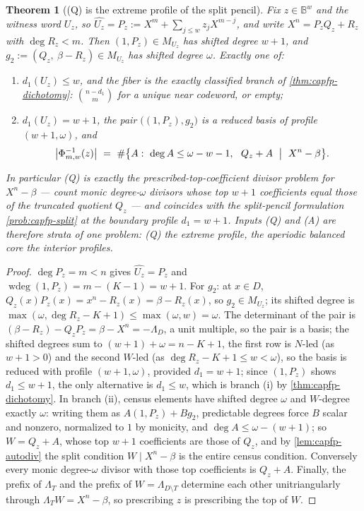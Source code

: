 \documentclass[11pt]{article}
\newtheorem{theorem}{Theorem}[section]
\theoremstyle{definition}
\theoremstyle{remark}
\newcommand{\B}{\mathbb{B}}
\begin{document}
\begin{theorem}[\textup{(Q)} is the extreme profile of the split pencil]\label{thm:capfp-Q-unify}
Fix $z\in\B^w$ and the witness word $U_z$, so $\widehat{U_z}=P_z:=X^m+\sum_{j\le w}z_jX^{m-j}$, and write $X^n=P_zQ_z+R_z$ with $\deg R_z<m$.  Then $(1,P_z)\in M_{U_z}$ has shifted degree $w+1$, and $g_2:=(Q_z,\ \beta-R_z)\in M_{U_z}$ has shifted degree $\omega$.  Exactly one of:
\begin{enumerate}[label=\textup{(\roman*)}]
\item $d_1(U_z)\le w$, and the fiber is the exactly classified branch of \cref{thm:capfp-dichotomy}: $\binom{n-d_1}m$ for a unique near codeword, or empty;
\item $d_1(U_z)=w+1$, the pair $\bigl((1,P_z),g_2\bigr)$ is a reduced basis of profile $(w+1,\omega)$, and
\[
        \bigl|\Phi_{m,w}^{-1}(z)\bigr|\ =\ \#\bigl\{A:\ \deg A\le\omega-w-1,\ \ Q_z+A\ \bigm|\ X^n-\beta\bigr\}.
\]
\end{enumerate}
In particular \textup{(Q)} is exactly the prescribed-top-coefficient divisor problem for $X^n-\beta$ --- count monic degree-$\omega$ divisors whose top $w+1$ coefficients equal those of the truncated quotient $Q_z$ --- and coincides with the split-pencil formulation \cref{prob:capfp-split} at the boundary profile $d_1=w+1$.  Inputs \textup{(Q)} and \textup{(A)} are therefore strata of one problem: \textup{(Q)} the extreme profile, the aperiodic balanced core the interior profiles.
\end{theorem}

\begin{proof}
$\deg P_z=m<n$ gives $\widehat{U_z}=P_z$ and $\operatorname{wdeg}(1,P_z)=m-(K-1)=w+1$.  For $g_2$: at $x\in D$, $Q_z(x)P_z(x)=x^n-R_z(x)=\beta-R_z(x)$, so $g_2\in M_{U_z}$; its shifted degree is $\max(\omega,\deg R_z-K+1)\le\max(\omega,w)=\omega$.  The determinant of the pair is $(\beta-R_z)-Q_zP_z=\beta-X^n=-\Lambda_D$, a unit multiple, so the pair is a basis; the shifted degrees sum to $(w+1)+\omega=n-K+1$, the first row is $N$-led \textup(as $w+1>0$\textup) and the second $W$-led \textup(as $\deg R_z-K+1\le w<\omega$\textup), so the basis is reduced with profile $(w+1,\omega)$, provided $d_1=w+1$; since $(1,P_z)$ shows $d_1\le w+1$, the only alternative is $d_1\le w$, which is branch \textup{(i)} by \cref{thm:capfp-dichotomy}.  In branch \textup{(ii)}, census elements have shifted degree $\omega$ and $W$-degree exactly $\omega$: writing them as $A(1,P_z)+Bg_2$, predictable degrees force $B$ scalar and nonzero, normalized to $1$ by monicity, and $\deg A\le\omega-(w+1)$; so $W=Q_z+A$, whose top $w+1$ coefficients are those of $Q_z$, and by \cref{lem:capfp-autodiv} the split condition $W\mid X^n-\beta$ is the entire census condition.  Conversely every monic degree-$\omega$ divisor with those top coefficients is $Q_z+A$.  Finally, the prefix of $\Lambda_T$ and the prefix of $W=\Lambda_{D\setminus T}$ determine each other unitriangularly through $\Lambda_TW=X^n-\beta$, so prescribing $z$ is prescribing the top of $W$.
\end{proof}
\end{document}

